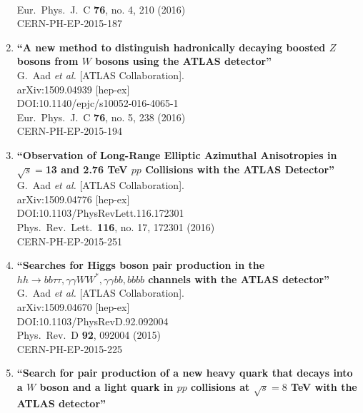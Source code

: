 \documentclass{article}
\begin{document}
\begin{enumerate}
  \\{}Eur.\ Phys.\ J.\ C {\bf 76}, no. 4, 210 (2016)
  \\{}CERN-PH-EP-2015-187
\item%
{\bf ``A new method to distinguish hadronically decaying boosted $Z$ bosons from $W$ bosons using the ATLAS detector''}
  \\{}G.~Aad {\it et al.} [ATLAS Collaboration].
  \\{}arXiv:1509.04939 [hep-ex]
  \\{}DOI:10.1140/epjc/s10052-016-4065-1
  \\{}Eur.\ Phys.\ J.\ C {\bf 76}, no. 5, 238 (2016)
  \\{}CERN-PH-EP-2015-194
\item%
{\bf ``Observation of Long-Range Elliptic Azimuthal Anisotropies in $\sqrt{s}=$13 and 2.76 TeV $pp$ Collisions with the ATLAS Detector''}
  \\{}G.~Aad {\it et al.} [ATLAS Collaboration].
  \\{}arXiv:1509.04776 [hep-ex]
  \\{}DOI:10.1103/PhysRevLett.116.172301
  \\{}Phys.\ Rev.\ Lett.\  {\bf 116}, no. 17, 172301 (2016)
  \\{}CERN-PH-EP-2015-251
\item%
{\bf ``Searches for Higgs boson pair production in the $hh\to bb\tau\tau, \gamma\gamma WW^*, \gamma\gamma bb, bbbb$ channels with the ATLAS detector''}
  \\{}G.~Aad {\it et al.} [ATLAS Collaboration].
  \\{}arXiv:1509.04670 [hep-ex]
  \\{}DOI:10.1103/PhysRevD.92.092004
  \\{}Phys.\ Rev.\ D {\bf 92}, 092004 (2015)
  \\{}CERN-PH-EP-2015-225
\item%
{\bf ``Search for pair production of a new heavy quark that decays into a $W$ boson and a light quark in $pp$ collisions at $\sqrt{s} = 8$ TeV with the ATLAS detector''}

\end{enumerate}
\end{document}
